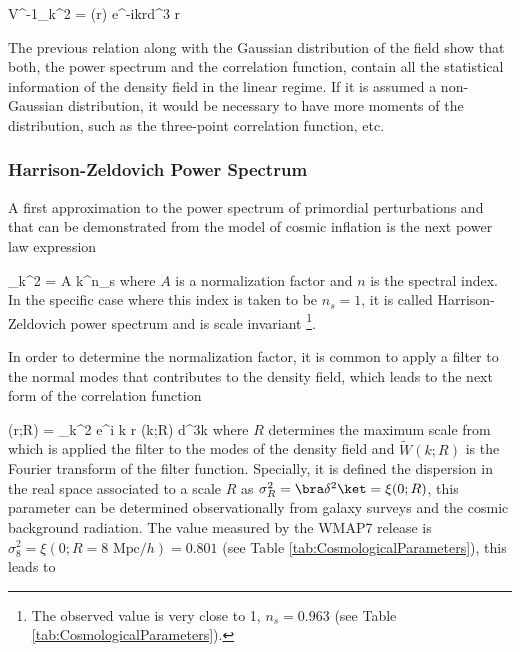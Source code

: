 { V^{-1}\sigma_k^2 = \int \xi(\bds r) e^{-i\bds k\cdot \bds r}d^3 \bds r }


The previous relation along with the Gaussian distribution of the field 
show that both, the power spectrum and the correlation function, contain
all the statistical information of the density field in the linear regime.
If it is assumed a non-Gaussian distribution, it would be necessary to 
have more moments of the distribution, such as the three-point correlation
function, etc.



			\subsubsection*{Harrison-Zeldovich Power Spectrum}
			

A first approximation to the power spectrum of primordial perturbations 
and that can be demonstrated from the model of cosmic inflation
\cite{padmanabhan1995} is the next power law expression


{ \sigma_k^2 = A k^{n_s} }
where $A$ is a normalization factor and $n$ is the spectral index. In the 
specific case where this index is taken to be $n_s=1$, it is called 
Harrison-Zeldovich power spectrum and is scale invariant \footnote{The 
observed value is very close to 1, $n_s = 0.963$ (see Table
\ref{tab:CosmologicalParameters}).}.


In order to determine the normalization factor, it is common to apply a
filter to the normal modes that contributes to the density field, which
leads to the next form of the correlation function


{ \xi(\bds r;R) = \int {}\sigma_k^2 
e^{i \bds k \cdot \bds r} (k;R) d^3\bds k }
where $R$ determines the maximum scale from which is applied the filter
to the modes of the density field and $\tilde{W}(k;R)$ is the Fourier 
transform of the filter function. Specially, it is defined the dispersion
in the real space associated to a scale $R$ as $\sigma^2_R = \bra \delta^2
\ket = \xi(0; R)$, this parameter can be determined observationally from
galaxy surveys and the cosmic background radiation. The value measured by
the WMAP7 release is $\sigma^2_8 = \xi(0; R = 8 \mbox{ Mpc}/h) = 0.801$ 
(see Table \ref{tab:CosmologicalParameters}), this leads to 



